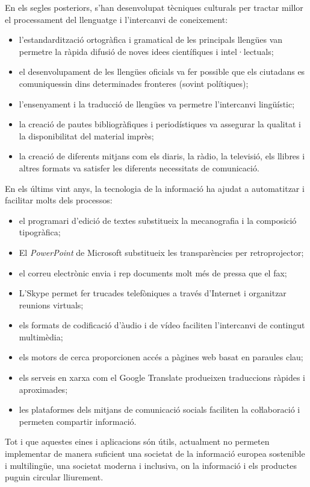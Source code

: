 \begin{multicols}{2}
En els segles posteriors, s’han desenvolupat tècniques culturals per tractar millor el processament del llenguatge i l’intercanvi de coneixement: 
\begin{itemize}
\item l’estandardització ortogràfica i gramatical de les principals llengües van permetre la ràpida difusió de noves idees científiques i intel·lectuals;
\item el desenvolupament de les llengües oficials va fer possible que els ciutadans es comuniquessin dins determinades fronteres (sovint polítiques);
\item l’ensenyament i la traducció de llengües va permetre l’intercanvi lingüístic;
\item la creació de pautes bibliogràfiques i periodístiques va assegurar la qualitat i la disponibilitat del material imprès;
\item la creació de diferents mitjans com els diaris, la ràdio, la televisió, els llibres i altres formats va satisfer les diferents necessitats de comunicació. 
\end{itemize}
En els últims vint anys, la tecnologia de la informació ha ajudat a automatitzar i facilitar molts dels processos:
\begin{itemize}
\item el programari d’edició de textes substitueix la mecanografia i la composició tipogràfica;
\item El \textit{PowerPoint} de Microsoft substitueix les transparències per retroprojector;
\item el correu electrònic envia i rep documents molt més de pressa que el fax;
\item L’Skype permet fer trucades telefòniques a través d’Internet i organitzar reunions virtuals;
\item els formats de codificació d’àudio i de vídeo faciliten l’intercanvi de contingut multimèdia;
\item els motors de cerca proporcionen accés a pàgines web basat en paraules clau;
\item els serveis en xarxa com el Google Translate produeixen traduccions ràpides i aproximades;
\item les plataformes dels mitjans de comunicació socials faciliten la coŀlaboració i permeten compartir informació.
\end{itemize}
Tot i que aquestes eines i aplicacions són útils, actualment no permeten implementar de manera suficient una societat de la informació europea sostenible i multilingüe, una societat moderna i inclusiva, on la informació i els productes puguin circular lliurement.


\end{multicols}
